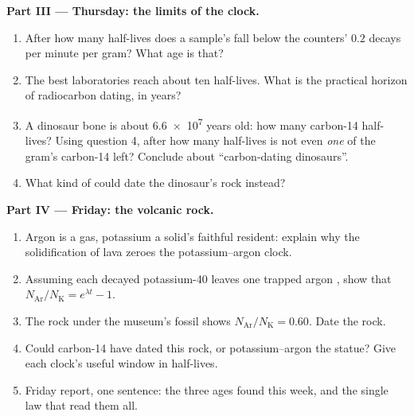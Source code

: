 \begin{problem}
\medskip
\noindent\textbf{Part III --- Thursday: the limits of the clock.}
\begin{enumerate}[resume]
  \item After how many half-lives does a sample's  fall below the
        counters' $0.2$ decays per minute per gram? What age is that?
  \item The best laboratories reach about ten half-lives. What is the
        practical horizon of radiocarbon dating, in years?
  \item A dinosaur bone is about \num{6.6e7} years old: how many
        carbon-14 half-lives? Using question 4, after how many half-lives
        is not even \emph{one}  of the gram's carbon-14 left?
        Conclude about ``carbon-dating dinosaurs''.
  \item What kind of  could date the dinosaur's rock instead?
\end{enumerate}

\medskip
\noindent\textbf{Part IV --- Friday: the volcanic rock.}
\begin{enumerate}[resume]
  \item Argon is a gas, potassium a solid's faithful resident: explain
        why the solidification of lava zeroes the potassium--argon clock.
  \item Assuming each decayed potassium-40  leaves one trapped
        argon , show that
        $N_{\mathrm{Ar}}/N_{\mathrm K} = e^{\lambda t} - 1$.
  \item The rock under the museum's fossil shows
        $N_{\mathrm{Ar}}/N_{\mathrm K} = 0.60$. Date the rock.
  \item Could carbon-14 have dated this rock, or potassium--argon the
        statue? Give each clock's useful window in half-lives.
  \item Friday report, one sentence: the three ages found this week, and
        the single law that read them all.
\end{enumerate}
\end{problem}

